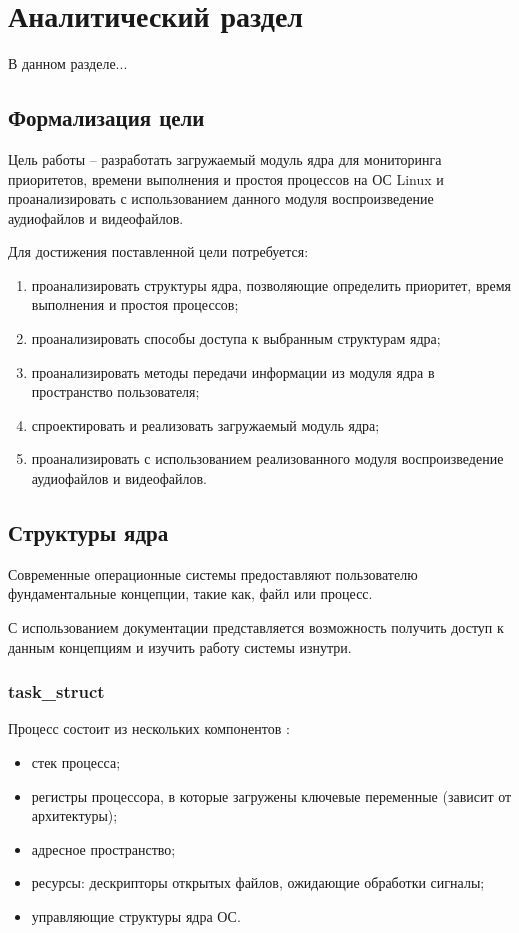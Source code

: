 \section{Аналитический раздел}
В данном разделе...

\subsection{Формализация цели}
Цель работы -- разработать загружаемый модуль ядра для мониторинга приоритетов, времени выполнения и простоя процессов на ОС Linux и проанализировать с использованием данного модуля воспроизведение аудиофайлов и видеофайлов.

Для достижения поставленной цели потребуется:
\begin{enumerate}[leftmargin=1.6\parindent]
\item проанализировать структуры ядра, позволяющие определить приоритет, время выполнения и простоя процессов;
\item проанализировать способы доступа к выбранным структурам ядра;
\item проанализировать методы передачи информации из модуля ядра в пространство пользователя;
\item спроектировать и реализовать загружаемый модуль ядра;
\item проанализировать с использованием реализованного модуля воспроизведение аудиофайлов и видеофайлов.
\end{enumerate}

\subsection{Структуры ядра}
Современные операционные системы предоставляют пользователю фундаментальные концепции, такие как, файл или процесс. \cite{linuxTasks}

С использованием документации представляется возможность получить доступ к данным концепциям и изучить работу системы изнутри.

\subsubsection{task\_struct}
Процесс состоит из нескольких компонентов \cite{linuxTasks}:
\begin{itemize}[leftmargin=1.6\parindent]
\item стек процесса;
\item регистры процессора, в которые загружены ключевые переменные (зависит от архитектуры);
\item адресное пространство;
\item ресурсы: дескрипторы открытых файлов, ожидающие обработки сигналы;
\item управляющие структуры ядра ОС.
\end{itemize}

